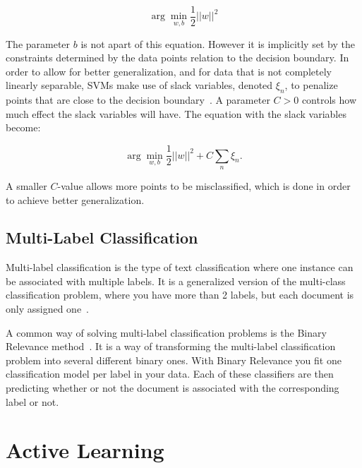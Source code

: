 \begin{equation}
    \arg\min_{w,b}\frac{1}{2}||w||^2
\end{equation}

The parameter $b$ is not apart of this equation. 
However it is implicitly set by the constraints determined by the data points relation to the decision boundary.
In order to allow for better generalization, and for data that is not completely linearly separable, SVMs make use of slack variables, denoted $\xi_n$, to penalize points that are close to the decision boundary~\cite{bishop2006pattern}.
A parameter $C>0$ controls how much effect the slack variables will have.
The equation with the slack variables become:

\begin{equation}
    \arg\min_{w,b}\frac{1}{2}||w||^2 + C \sum_n\xi_n.
\end{equation}

A smaller $C$-value allows more points to be misclassified, which is done in order to achieve better generalization.

\subsection{Multi-Label Classification}\label{subsec:multi-label-classification}

Multi-label classification is the type of text classification where one instance can be associated with multiple labels.
It is a generalized version of the multi-class classification problem, where you have more than 2 labels, but each document is only assigned one~\cite{tsoumakas2006multi}.

A common way of solving multi-label classification problems is the Binary Relevance method~\cite{read2011classifier, boutell2004learning, luaces2012binary}.
It is a way of transforming the multi-label classification problem into several different binary ones.
With Binary Relevance you fit one classification model per label in your data.
Each of these classifiers are then predicting whether or not the document is associated with the corresponding label or not.

\section{Active Learning}\label{sec:active-learning}


